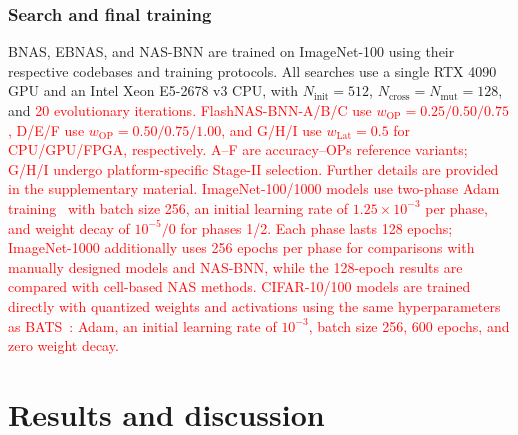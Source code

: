 \documentclass[a4paper,fleqn]{cas-sc}
\begin{document}
\subsubsection{Search and final training}
BNAS, EBNAS, and NAS-BNN are trained on ImageNet-100 using their respective codebases and training protocols.
All searches use a single RTX 4090 GPU and an Intel Xeon E5-2678 v3 CPU, with $N_{\text{init}}=512$, $N_{\text{cross}}=N_{\text{mut}}=128$, and \textcolor{red}{20 evolutionary iterations.}
\textcolor{red}{FlashNAS-BNN-A/B/C use $w_{\mathrm{OP}}=0.25/0.50/0.75$, D/E/F use $w_{\mathrm{OP}}=0.50/0.75/1.00$, and G/H/I use $w_{\mathrm{Lat}}=0.5$ for CPU/GPU/FPGA, respectively. A--F are accuracy--OPs reference variants; G/H/I undergo platform-specific Stage-II selection. Further details are provided in the supplementary material.}
\textcolor{red}{ImageNet-100/1000 models use two-phase Adam training~\cite{kingma2015adam} with batch size 256, an initial learning rate of $1.25\times10^{-3}$ per phase, and weight decay of $10^{-5}/0$ for phases 1/2. Each phase lasts 128 epochs; ImageNet-1000 additionally uses 256 epochs per phase for comparisons with manually designed models and NAS-BNN, while the 128-epoch results are compared with cell-based NAS methods.}
\textcolor{red}{CIFAR-10/100 models are trained directly with quantized weights and activations using the same hyperparameters as BATS~\cite{Bulat2020}: Adam, an initial learning rate of $10^{-3}$, batch size 256, 600 epochs, and zero weight decay.}

\section{Results and discussion}
\end{document}
